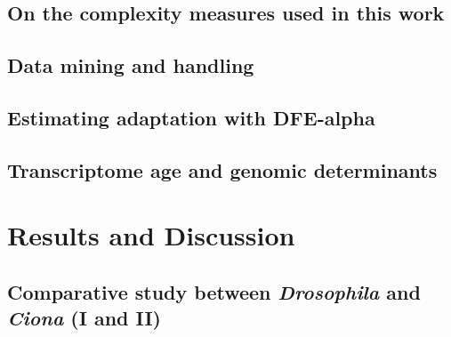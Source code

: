 \documentclass[officiallayout]{tktla_modified}
\begin{document}
	\section{On the complexity measures used in this work}
	

	\section{Data mining and handling}
	

	\section{Estimating adaptation with DFE-alpha}
	

	\section{Transcriptome age and genomic determinants}
	

%
\clearpage

	
\chapter{Results and Discussion}

%	
%	

%	

\section{Comparative study between \textit{Drosophila} and \textit{Ciona} (I and II)}
	
\end{document}
